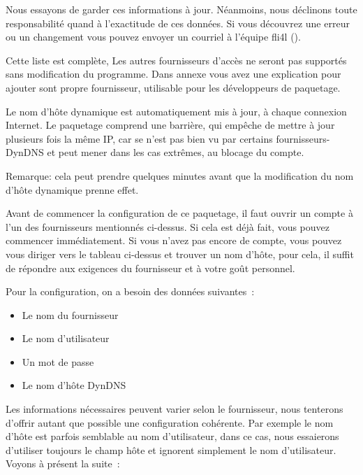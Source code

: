 

    Nous essayons de garder ces informations à jour. Néanmoins, nous déclinons
    toute responsabilité quand à l'exactitude de ces données. Si vous découvrez
    une erreur ou un changement vous pouvez envoyer un courriel à l'équipe fli4l
    ().

    Cette liste est complète, Les autres fournisseurs d'accès ne seront pas
    supportés sans modification du programme. Dans annexe vous avez une explication
    pour ajouter sont propre fournisseur, utilisable pour les développeurs de
    paquetage.

    Le nom d'hôte dynamique est automatiquement mis à jour, à chaque connexion
    Internet. Le paquetage comprend une barrière, qui empêche de mettre à jour
    plusieurs fois la même IP, car se n'est pas bien vu par certains
    fournisseurs-DynDNS et peut mener dans les cas extrêmes, au blocage du compte.

    Remarque: cela peut prendre quelques minutes avant que la modification du
    nom d'hôte dynamique prenne effet.

    Avant de commencer la configuration de ce paquetage, il faut ouvrir un
    compte à l'un des fournisseurs mentionnés ci-dessus. Si cela est déjà fait,
    vous pouvez commencer immédiatement. Si vous n'avez pas encore de compte,
    vous pouvez vous diriger vers le tableau ci-dessus et trouver un nom d'hôte,
    pour cela, il suffit de répondre aux exigences du fournisseur et à votre
    goût personnel.

    Pour la configuration, on a besoin des données suivantes~:

  \begin{itemize}
    \item Le nom du fournisseur
    \item Le nom d'utilisateur
    \item Un mot de passe
    \item Le nom d'hôte DynDNS
  \end{itemize}

    Les informations nécessaires peuvent varier selon le fournisseur, nous
    tenterons d'offrir autant que possible une configuration cohérente.
    Par exemple le nom d'hôte est parfois semblable au nom d'utilisateur, dans
    ce cas, nous essaierons d'utiliser toujours le champ hôte et ignorent
    simplement le nom d'utilisateur. Voyons à présent la suite~:

